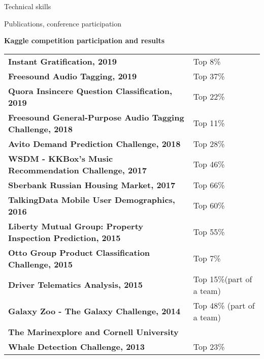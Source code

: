 \documentclass{resume} %
\begin{document}
\begin{rSection}{Technical skills}
\begin{rSection}{Publications, conference participation}
\end{rSection}

\pagebreak

{\bf Kaggle competition participation and results}

\begin{tabular}{ @{} >{\bfseries}l @{\hspace{6ex}} l }
Instant Gratification, 2019 & Top 8\% \\
Freesound Audio Tagging, 2019 & Top 37\% \\
Quora Insincere Question Classification, 2019 & Top 22\% \\
Freesound General-Purpose Audio Tagging Challenge, 2018 & Top 11\% \\
Avito Demand Prediction Challenge, 2018 & Top 28\% \\
WSDM - KKBox's Music Recommendation Challenge, 2017 & Top 46\% \\
Sberbank Russian Housing Market, 2017 & Top 66\% \\
TalkingData Mobile User Demographics, 2016 & Top 60\% \\
Liberty Mutual Group: Property Inspection Prediction, 2015 & Top 55\% \\
Otto Group Product Classification Challenge, 2015 & Top 7\% \\ 
Driver Telematics Analysis, 2015 & Top 15\%(part of a team) \\ 
Galaxy Zoo - The Galaxy Challenge, 2014 & Top 48\% (part of a team) \\
The Marinexplore and Cornell University & \\
Whale Detection Challenge, 2013 & Top 23\%
\end{tabular}


\end{rSection}


\end{document}
